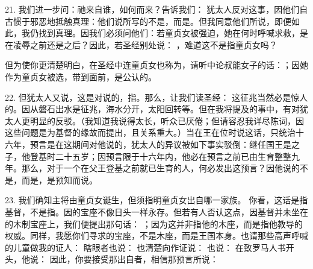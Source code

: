 21. 我们进一步问：祂来自谁，如何而来？告诉我们： 犹太人反对这事，因他们自古惯于邪恶地抵触真理：他们说所写的不是，而是。但我同意他们所说，即便如此，我仍找到真理。因我们必须问他们：若童贞女被强迫，她在何时呼喊求救，是在凌辱之前还是之后？因此，若圣经别处说： ，难道这不是指童贞女吗？\par

但为使你更清楚明白，在圣经中连童贞女也称为，请听中论叔能女子的话：；因她作为童贞女被选，带到面前，是公认的。\par

22. 但犹太人又说，这是对说的，指。那么，让我们读圣经：  这征兆当然必是惊人的。因从磐石出水是征兆，海水分开，太阳回转等。但在我将提及的事中，有对犹太人更明显的反驳。（我知道我说得太长，听众已厌倦；但请容忍我详尽陈词，因这些问题是为基督的缘故而提出，且关系重大。）当在王在位时说这话，只统治十六年，预言是在这期间对他说的，犹太人的异议被如下事实驳倒：继任国王是之子，他登基时二十五岁；因预言限于十六年内，他必在预言之前已由生育整整九年。那么，对于一个在父王登基之前就已生育的人，何必发出这预言？因他说的不是，而是，是预知而说。\par

23. 我们确知主将由童贞女诞生，但须指明童贞女出自哪一家族。   你看，这话是指基督，不是指。因的宝座不像日头一样永存。但若有人否认这点，因基督并未坐在的木制宝座上，我们便提出那句话： ；因为这并非指他的木座，而是指他教导的权威。同样，我愿你们寻求的宝座，不是木座，而是王国本身。也请那些高声呼喊的儿童做我的证人：   瞎眼者也说：  也清楚向作证说：  也说：  在致罗马人书开头，他说：  因此，你要接受那出自者，相信那预言所说：\par

